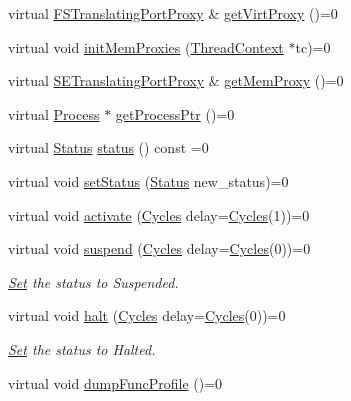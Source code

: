 \begin{DoxyCompactItemize}
\item 
virtual \hyperlink{classFSTranslatingPortProxy}{FSTranslatingPortProxy} \& \hyperlink{classThreadContext_a55e3a4b93d5f1ad641247f6d223191c6}{getVirtProxy} ()=0
\item 
virtual void \hyperlink{classThreadContext_a6657d03bdea324a6ada2e4450307262c}{initMemProxies} (\hyperlink{classThreadContext}{ThreadContext} $\ast$tc)=0
\item 
virtual \hyperlink{classSETranslatingPortProxy}{SETranslatingPortProxy} \& \hyperlink{classThreadContext_a840e8764d04f2a3fb061c56738f3a874}{getMemProxy} ()=0
\item 
virtual \hyperlink{classProcess}{Process} $\ast$ \hyperlink{classThreadContext_a8725d0e5dce89a4a086c7de4bb9d4454}{getProcessPtr} ()=0
\item 
virtual \hyperlink{classThreadContext_a67a0db04d321a74b7e7fcfd3f1a3f70b}{Status} \hyperlink{classThreadContext_adfba9b39542cba955a02b8ff3ba023a9}{status} () const =0
\item 
virtual void \hyperlink{classThreadContext_ab09e388dd57fd5b8e05da30473b0a859}{setStatus} (\hyperlink{classThreadContext_a67a0db04d321a74b7e7fcfd3f1a3f70b}{Status} new\_\-status)=0
\item 
virtual void \hyperlink{classThreadContext_a9270160e6cce25ded6999f6e4e60a3ed}{activate} (\hyperlink{classCycles}{Cycles} delay=\hyperlink{classCycles}{Cycles}(1))=0
\item 
virtual void \hyperlink{classThreadContext_af2ae27d19d77b0301484ac488d97d37b}{suspend} (\hyperlink{classCycles}{Cycles} delay=\hyperlink{classCycles}{Cycles}(0))=0
\begin{DoxyCompactList}\small\item\em \hyperlink{classSet}{Set} the status to Suspended. \item\end{DoxyCompactList}\item 
virtual void \hyperlink{classThreadContext_a1cf6e868fcd49300a04acd0cae4fd142}{halt} (\hyperlink{classCycles}{Cycles} delay=\hyperlink{classCycles}{Cycles}(0))=0
\begin{DoxyCompactList}\small\item\em \hyperlink{classSet}{Set} the status to Halted. \item\end{DoxyCompactList}\item 
virtual void \hyperlink{classThreadContext_ae3f0b63a85470c17e675083487febead}{dumpFuncProfile} ()=0
\item 

\end{DoxyCompactItemize}
